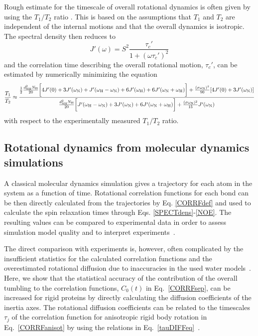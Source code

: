 \documentclass[journal=jpcbfk,manuscript=article]{achemso}
\begin{document}
Rough estimate for the timescale of overall rotational dynamics 
is often given by using the $T_1/T_2$ ratio \cite{kay89}. 
This is based on the assumptions that $T_1$ and $T_2$
are independent of the internal motions and that the overall
dynamics is isotropic. The spectral density then reduces to 
\begin{equation}
J'(\omega) = S^2\frac{\tau_c'}{1+(\omega \tau_c')^2} 
\end{equation}
and the correlation time describing the overall rotational motion, $\tau_c'$, can 
be estimated by numerically minimizing the equation
\begin{equation}\label{ratioEQ}
  \frac{T_1}{T_2} \approx  \frac{\frac{1}{2}\frac{d_{\rm{NH}}^2N_{\rm{H}}}{20}\bigg[4J'(0)+3J'(\omega_{\rm{N}})+J'(\omega_{\rm{H}}-\omega_{\rm{N}})+6J'(\omega_{\rm{H}})  +6J'(\omega_{\rm{N}}+\omega_{\rm{H}})\bigg]+\frac{(\sigma \omega_{\rm{N}})^2}{90}[4J'(0) +3J'(\omega_{\rm{N}})]}{\frac{d_{\rm{NH}}^2N_{\rm{H}}}{20}\bigg[J'(\omega_{\rm{H}}-\omega_{\rm{N}})+3J'(\omega_{\rm{N}})+6J'(\omega_{\rm{N}}+\omega_{\rm{H}})\bigg] +\frac{(\sigma \omega_{\rm{N}})^2}{15}J'(\omega_{\rm{N}})}
\end{equation}
with respect to the experimentally measured $T_1/T_2$ ratio.

\subsection{Rotational dynamics from molecular dynamics simulations}\label{MDanalysis}
A classical molecular dynamics simulation gives a trajectory for each atom in
the system as a function of time. Rotational correlation functions for each bond
can be then directly calculated from the trajectories by Eq. \ref{CORRFdef}
and used to calculate the spin relaxation times through Eqs. \ref{SPECTdens}-\ref{NOE}.
The resulting values can be compared to experimental data in order to assess simulation model
quality \cite{best04,showalter07a,showalter07b,maragakis08,trbovic08,fisette12,debiec18,debiec16,salvi16,hoffmann18} and
to interpret experiments~\cite{fisette12,debiec18,anderson17}.

The direct comparison with experiments is, however, often complicated by
the insufficient statistics for the calculated correlation functions and the overestimated
rotational diffusion due to inaccuracies in the used water models~\cite{wong08,anderson12,takemura12}.
Here, we show that the statistical accuracy of the contribution of the
overall tumbling to the correlation functions, $C_0(t)$ in Eq.~\ref{CORRFsep}, can be increased for
rigid proteins by directly calculating the diffusion coefficients of the inertia axes.
The rotational diffusion coefficients can be related to the timescales $\tau_j$
of the correlation function for anisotropic rigid body rotation
in Eq.~\ref{CORRFanisot} by using the relations in Eq.~\ref{tauDIFFeq}~\cite{woessner62}.
\end{document}
